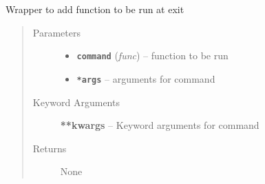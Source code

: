 \documentclass[letterpaper,10pt,english]{sphinxmanual}
\begin{document}

\begin{fulllineitems}
\label{run:run.addatexit__}
Wrapper to add function to be run at exit
\begin{quote}\begin{description}
\item[{Parameters}] \leavevmode\begin{itemize}
\item {} 
\textbf{\texttt{command}} (\emph{func}) -- function to be run

\item {} 
\textbf{\texttt{*args}} -- arguments for command

\end{itemize}

\item[{Keyword Arguments}] \leavevmode
\textbf{**kwargs} --
Keyword arguments for command

\item[{Returns}] \leavevmode
None

\end{description}\end{quote}

\end{fulllineitems}

\end{document}
